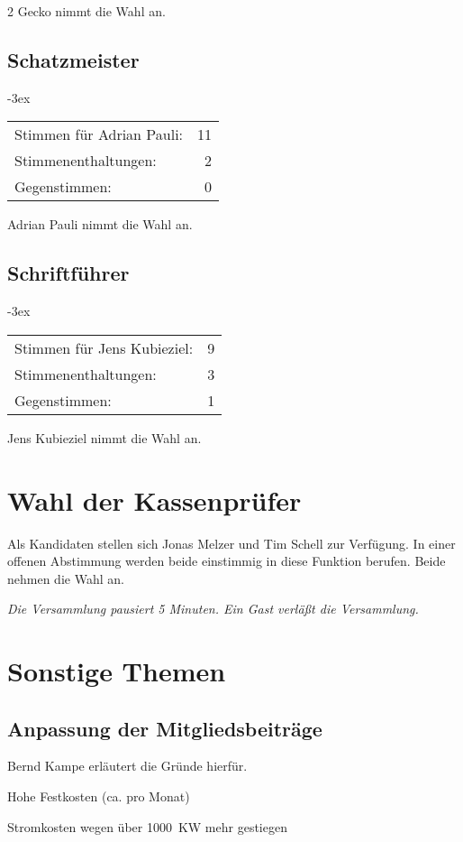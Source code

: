 \documentclass[]{scrartcl}
\newenvironment{packed_item}{
\begin{itemize}
\setlength{\itemsep}{-5pt}
\setlength{\parsep}{0pt}
}{\end{itemize}}
\newenvironment{eingerueckt}{
\begin{addmargin*}[3ex]{-3ex}
\begin{minipage}{\linewidth}
}{
\end{minipage}
\end{addmargin*}}
\newcommand{\qbi}{Jens Kubieziel}
\newcommand{\berndf}{Bernd Kampe}
\newcommand{\adrian}{Adrian Pauli}
\newcommand{\gecko}{Gecko}
\newcommand{\joe}{Jonas Melzer}
\begin{document}
\begin{multicols}{2}
\gecko{} nimmt die Wahl an.

\subsection{Schatzmeister}
\begin{eingerueckt}
\begin{tabular}{lr}
Stimmen für \adrian{}: & 11 \\
Stimmenenthaltungen: & 2 \\
Gegenstimmen: & 0
\end{tabular}
\end{eingerueckt}

\adrian{} nimmt die Wahl an.

\subsection{Schriftführer}
\begin{eingerueckt}
\begin{tabular}{lr}
Stimmen für \qbi{}: & 9 \\
Stimmenenthaltungen: & 3 \\
Gegenstimmen: & 1
\end{tabular}
\end{eingerueckt}

\qbi{} nimmt die Wahl an.

\section{Wahl der Kassenprüfer}
Als Kandidaten stellen sich \joe{} und Tim Schell zur Verfügung. In einer
offenen Abstimmung werden beide einstimmig in diese Funktion berufen. Beide
nehmen die Wahl an.

\vspace{1em}
\textsl{Die Versammlung pausiert 5 Minuten. Ein Gast verläßt die
Versammlung.}

\section{Sonstige Themen}

\subsection{Anpassung der Mitgliedsbeiträge}
\berndf{} erläutert die Gründe hierfür.
\begin{packed_item}
\item Hohe Festkosten (ca.  pro Monat)
\item Stromkosten wegen über 1000~KW mehr gestiegen
\end{packed_item}


\end{multicols}
\end{document}
